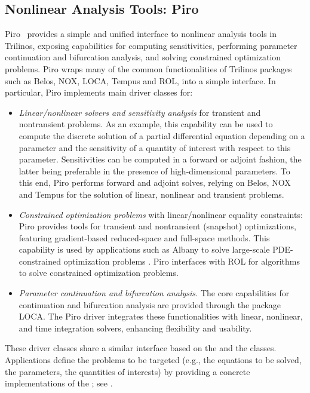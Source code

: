 \subsection{Nonlinear Analysis Tools: Piro}
Piro~\cite{osti_1231283} provides a simple and unified interface to nonlinear analysis tools in Trilinos, exposing capabilities for computing sensitivities, performing parameter continuation and bifurcation analysis, and solving constrained optimization problems. Piro wraps many of the common functionalities of Trilinos packages such as Belos, NOX, LOCA, Tempus and ROL, into a simple interface.
In particular, Piro implements main driver classes for:
\begin{itemize}
	\item \emph{Linear/nonlinear solvers and sensitivity analysis} for transient and nontransient problems. As an example, this capability can be used to compute the discrete solution of a partial differential equation depending on a parameter and the sensitivity of a quantity of interest with respect to this parameter. Sensitivities can be computed in a forward or adjoint fashion, the latter being preferable in the presence of high-dimensional parameters. To this end, Piro performs forward and adjoint solves, relying on Belos, NOX and Tempus for the solution of linear, nonlinear and transient problems.
	\item \emph{Constrained optimization problems} with linear/nonlinear equality constraints: Piro provides tools for transient and nontransient (snapshot) optimizations, featuring gradient-based reduced-space and full-space methods. This capability is used by applications such as Albany to solve large-scale PDE-constrained optimization problems \cite{Perego2022}. Piro interfaces with ROL for algorithms to solve constrained optimization problems.
\item \emph{Parameter continuation and bifurcation analysis.} The core capabilities for continuation and bifurcation analysis are provided through the package LOCA. The Piro driver integrates these functionalities with linear, nonlinear, and time integration solvers, enhancing flexibility and usability.
\end{itemize}
These driver classes share a similar interface based on the  and the  classes. Applications define the problems to be targeted (e.g., the equations to be solved, the parameters, the quantities of interests) by providing a concrete implementations of the ; see \cite{pawlowski2012automating,pawlowski2012automatingpart2}.

